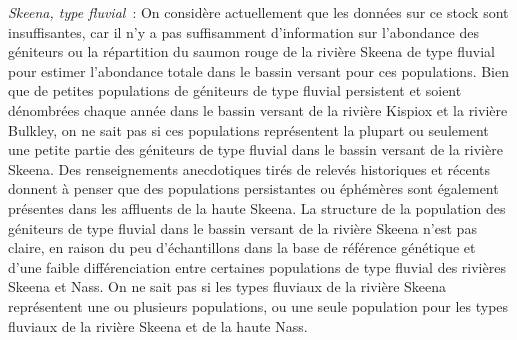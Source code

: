 \documentclass[french,11pt]{book}
\begin{document}
\begin{itemize}
  \emph{Skeena, type fluvial}~: On considère actuellement que les données sur ce stock sont insuffisantes, car il n'y a pas suffisamment d'information sur l'abondance des géniteurs ou la répartition du saumon rouge de la rivière Skeena de type fluvial pour estimer l'abondance totale dans le bassin versant pour ces populations. Bien que de petites populations de géniteurs de type fluvial persistent et soient dénombrées chaque année dans le bassin versant de la rivière Kispiox et la rivière Bulkley, on ne sait pas si ces populations représentent la plupart ou seulement une petite partie des géniteurs de type fluvial dans le bassin versant de la rivière Skeena. Des renseignements anecdotiques tirés de relevés historiques et récents donnent à penser que des populations persistantes ou éphémères sont également présentes dans les affluents de la haute Skeena. La structure de la population des géniteurs de type fluvial dans le bassin versant de la rivière Skeena n'est pas claire, en raison du peu d'échantillons dans la base de référence génétique et d'une faible différenciation entre certaines populations de type fluvial des rivières Skeena et Nass. On ne sait pas si les types fluviaux de la rivière Skeena représentent une ou plusieurs populations, ou une seule population pour les types fluviaux de la rivière Skeena et de la haute Nass.
\end{itemize}
\clearpage
\end{document}
